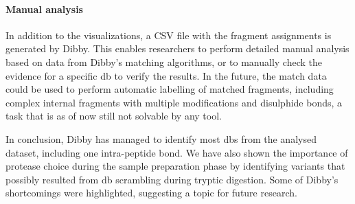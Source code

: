 \paragraph{Manual analysis} In addition to the visualizations, a CSV file with the fragment assignments is generated by Dibby. This enables researchers to perform detailed manual analysis based on data from Dibby's matching algorithms, or to manually check the evidence for a specific \gls*{db} to verify the results. In the future, the match data could be used to perform automatic labelling of matched fragments, including complex internal fragments with multiple modifications and disulphide bonds, a task that is as of now still not solvable by any tool.

In conclusion, Dibby has managed to identify most \glspl*{db} from the analysed dataset, including one intra-peptide bond. We have also shown the importance of protease choice during the sample preparation phase by identifying variants that possibly resulted from \gls*{db} scrambling during tryptic digestion. Some of Dibby's shortcomings were highlighted, suggesting a topic for future research.
